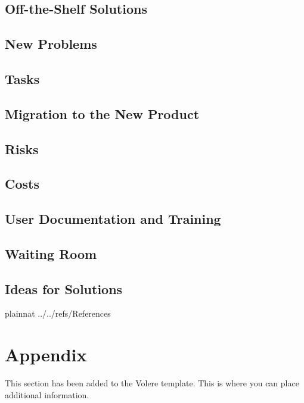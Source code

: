 \documentclass[12pt]{article}
\begin{document}
\subsection{Off-the-Shelf Solutions}

\subsection{New Problems}

\subsection{Tasks}

\subsection{Migration to the New Product}

\subsection{Risks}

\subsection{Costs}

\subsection{User Documentation and Training}

\subsection{Waiting Room}

\subsection{Ideas for Solutions}

\newpage

 {plainnat}
 {../../refs/References}

\newpage

\section{Appendix}

This section has been added to the Volere template.  This is where you can place
additional information.
\end{document}
